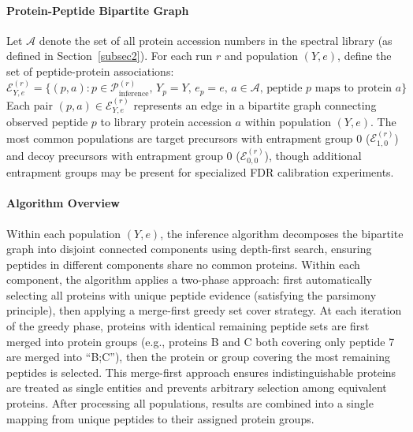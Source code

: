 \documentclass{article}
\begin{document}
\paragraph{Protein-Peptide Bipartite Graph} Let $\mathcal{A}$ denote the set of all protein accession numbers in the spectral library (as defined in Section~\ref{subsec2}). For each run $r$ and population $(Y, e)$, define the set of peptide-protein associations:
\begin{equation}
\mathcal{E}^{(r)}_{Y,e} = \{(p, a) : p \in \mathcal{P}_{\text{inference}}^{(r)}, \, Y_p = Y, \, e_p = e, \, a \in \mathcal{A}, \, \text{peptide } p \text{ maps to protein } a\}
\end{equation}
Each pair $(p, a) \in \mathcal{E}^{(r)}_{Y,e}$ represents an edge in a bipartite graph connecting observed peptide $p$ to library protein accession $a$ within population $(Y, e)$. The most common populations are target precursors with entrapment group 0 ($\mathcal{E}^{(r)}_{1,0}$) and decoy precursors with entrapment group 0 ($\mathcal{E}^{(r)}_{0,0}$), though additional entrapment groups may be present for specialized FDR calibration experiments.

\paragraph{Algorithm Overview} Within each population $(Y, e)$, the inference algorithm decomposes the bipartite graph into disjoint connected components using depth-first search, ensuring peptides in different components share no common proteins. Within each component, the algorithm applies a two-phase approach: first automatically selecting all proteins with unique peptide evidence (satisfying the parsimony principle), then applying a merge-first greedy set cover strategy. At each iteration of the greedy phase, proteins with identical remaining peptide sets are first merged into protein groups (e.g., proteins B and C both covering only peptide 7 are merged into ``B;C''), then the protein or group covering the most remaining peptides is selected. This merge-first approach ensures indistinguishable proteins are treated as single entities and prevents arbitrary selection among equivalent proteins. After processing all populations, results are combined into a single mapping from unique peptides to their assigned protein groups.
\end{document}
